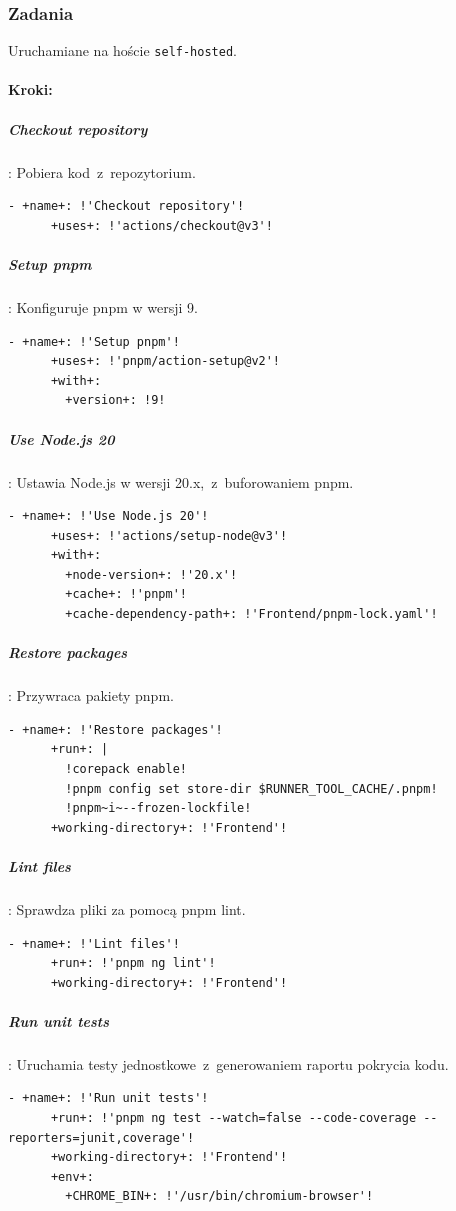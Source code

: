 \subsubsection{Zadania}
Uruchamiane na hoście \texttt{\textcolor{codeblue}{self-hosted}}.
\paragraph{Kroki:}
\subparagraph{Checkout repository}: Pobiera kod~z~repozytorium.
\begin{lstlisting}[style=yaml-colored]
    - +name+: !'Checkout repository'!
      +uses+: !'actions/checkout@v3'!
\end{lstlisting}

\subparagraph{Setup pnpm}: Konfiguruje pnpm w wersji 9.
\begin{lstlisting}[style=yaml-colored]
    - +name+: !'Setup pnpm'!
      +uses+: !'pnpm/action-setup@v2'!
      +with+:
        +version+: !9!
\end{lstlisting}

\subparagraph{Use Node.js 20}: Ustawia Node.js w wersji 20.x,~z~buforowaniem pnpm.
\begin{lstlisting}[style=yaml-colored]
    - +name+: !'Use Node.js 20'!
      +uses+: !'actions/setup-node@v3'!
      +with+:
        +node-version+: !'20.x'!
        +cache+: !'pnpm'!
        +cache-dependency-path+: !'Frontend/pnpm-lock.yaml'!
\end{lstlisting}

\subparagraph{Restore packages}: Przywraca pakiety pnpm.
\begin{lstlisting}[style=yaml-colored]
    - +name+: !'Restore packages'!
      +run+: |
        !corepack enable!
        !pnpm config set store-dir $RUNNER_TOOL_CACHE/.pnpm!
        !pnpm~i~--frozen-lockfile!
      +working-directory+: !'Frontend'!
\end{lstlisting}

\subparagraph{Lint files}: Sprawdza pliki za pomocą pnpm lint.
\begin{lstlisting}[style=yaml-colored]
    - +name+: !'Lint files'!
      +run+: !'pnpm ng lint'!
      +working-directory+: !'Frontend'!
\end{lstlisting}

\subparagraph{Run unit tests}: Uruchamia testy jednostkowe~z~generowaniem raportu pokrycia kodu.
\begin{lstlisting}[style=yaml-colored]
    - +name+: !'Run unit tests'!
      +run+: !'pnpm ng test --watch=false --code-coverage --reporters=junit,coverage'!
      +working-directory+: !'Frontend'!
      +env+:
        +CHROME_BIN+: !'/usr/bin/chromium-browser'!
\end{lstlisting}


